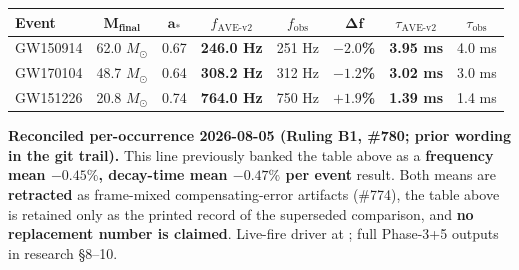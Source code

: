 \begin{center}
\renewcommand{\arraystretch}{1.3}
\begin{tabularx}{\textwidth}{@{}l c c c c c c c@{}}
\toprule
\textbf{Event} & $\mathbf{M_{final}}$ & $\mathbf{a_*}$ & \textbf{$f_\mathrm{AVE\text{-}v2}$} & \textbf{$f_\mathrm{obs}$} & $\boldsymbol{\Delta f}$ & \textbf{$\tau_\mathrm{AVE\text{-}v2}$} & \textbf{$\tau_\mathrm{obs}$} \\
\midrule
GW150914 & 62.0 $M_\odot$ & 0.67 & \textbf{246.0 Hz} & 251 Hz & \textbf{$-2.0$\%} & \textbf{3.95 ms} & 4.0 ms \\
GW170104 & 48.7 $M_\odot$ & 0.64 & \textbf{308.2 Hz} & 312 Hz & \textbf{$-1.2$\%} & \textbf{3.02 ms} & 3.0 ms \\
GW151226 & 20.8 $M_\odot$ & 0.74 & \textbf{764.0 Hz} & 750 Hz & \textbf{$+1.9$\%} & \textbf{1.39 ms} & 1.4 ms \\
\bottomrule
\end{tabularx}
\end{center}
\noindent \textbf{Reconciled per-occurrence 2026-08-05 (Ruling B1, \#780; prior wording in the git trail).} This line previously banked the table above as a \textbf{frequency mean $-0.45\%$, decay-time mean $-0.47\%$ per event} result. Both means are \textbf{retracted} as frame-mixed compensating-error artifacts (\#774), the table above is retained only as the printed record of the superseded comparison, and \textbf{no replacement number is claimed}. Live-fire driver at ; full Phase-3+5 outputs in research  \S 8--10.

